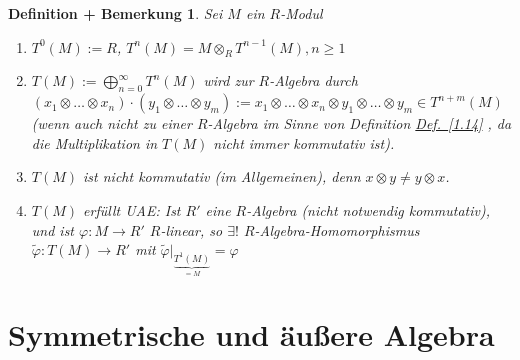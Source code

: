 \documentclass[a4paper,12pt]{scrbook}
\theoremstyle{break}
\newtheorem{DefBem}[Def]{Definition + Bemerkung}
\theoremstyle{nonumberbreak}
\theoremstyle{nonumberplain}
\newcommand{\myref}[2]{%
\hyperref[#2]{#1~\ref*{#2}}%
}
\begin{document}
\begin{DefBem}
  Sei $M$ ein $R$-Modul
  \begin{enumerate}
  \item[a)] $T^0(M) := R$, $ T^n(M) = M \otimes_R T^{n-1}(M), n \geq 1$
  \item[b)] $T(M) := \bigoplus^{\infty}_{n = 0 } T^n(M)$ wird zur $R$-Algebra durch\\
    $(x_1 \otimes \dots \otimes x_n) \cdot (y_1 \otimes \dots \otimes y_m) :=
    x_1 \otimes \dots \otimes x_n \otimes y_1 \otimes \dots \otimes y_m \in T^{n + m}(M)$
    (wenn auch nicht zu einer $R$-Algebra im Sinne von Definition \myref{Def.}{1.14},
    da die Multiplikation in $T(M)$ nicht immer kommutativ ist).
  \item[c)] $T(M)$ ist nicht kommutativ (im Allgemeinen), denn $ x \otimes y \neq y \otimes x$.
  \item[d)] $T(M)$ erfüllt UAE: Ist $R'$ eine $R$-Algebra (nicht notwendig kommutativ), und ist $\varphi: M \rightarrow R'$ $R$-linear, so $\exists !$ $R$-Algebra-Homomorphismus \\
    $\tilde{\varphi}:T(M) \rightarrow R'$ mit $\tilde{\varphi}|_{\underbrace{T^1(M)}_{=M}}=\varphi$
  \end{enumerate}
\end{DefBem}

\section{Symmetrische und äußere Algebra}
\end{document}

